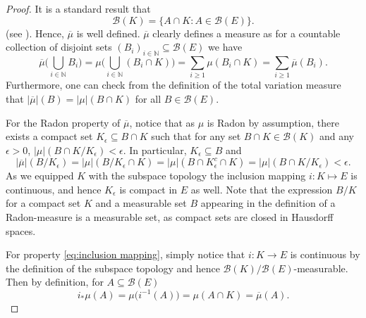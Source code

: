 \documentclass[11pt,a4paper,twoside,openany]{report}
\numberwithin{equation}{section}
\theoremstyle{plain} %
\theoremstyle{definition} %
\theoremstyle{remark} %
\let\parencite\authnumparencite
\begin{document}
\begin{proof}
    It is a standard result that 
    \begin{equation*}
        \mathcal{B}(K)=\{A\cap K:A\in\mathcal{B}(E)\}.
    \end{equation*}
    (see \parencite[Lemma.~6.2.4.]{Bogachev2007MeasureTheory}). Hence, \(\overline{\mu}\) is well defined. \(\overline{\mu}\) clearly defines a measure as for a countable collection of disjoint sets \((B_i)_{i\in\mathbb{N}}\subseteq\mathcal{B}(E)\) we have
    \begin{equation*}
        \overline{\mu}\Big(\bigcup_{i\in\mathbb{N}}B_i\Big)=\mu\Big(\bigcup_{i\in\mathbb{N}}(B_i\cap K)\Big)=\sum_{i\geq 1}\mu(B_i\cap K)=\sum_{i\geq 1}\overline{\mu}(B_i).
    \end{equation*}
    Furthermore, one can check from the definition of the total variation measure that \(|\overline{\mu}|(B)=|\mu|(B\cap K)\) for all \(B\in\mathcal{B}(E)\). 
    
    
           For the Radon property of \(\overline{\mu}\), notice that as \(\mu\) is Radon by assumption, there exists a compact set \(K_{\epsilon}\subseteq B\cap K\) such that for any set \(B\cap K\in\mathcal{B}(K)\) and any \(\epsilon>0\), \(|\mu|(B\cap K / K_{\epsilon})<\epsilon\). In particular, \(K_{\epsilon}\subseteq B\) and 
       \begin{equation*}
           |\overline{\mu}|(B/K_{\epsilon})=|\mu|(B/ K_{\epsilon}\cap K)=|\mu|(B\cap K_{\epsilon}^c\cap K)=|\mu|(B\cap K/ K_{\epsilon})<\epsilon.
       \end{equation*}
       As we equipped \(K\) with the subspace topology the inclusion mapping \(i:K\mapsto E\) is continuous, and hence \(K_{\epsilon}\) is compact in \(E\) as well. Note that the expression \(B/K\) for a compact set \(K\) and a measurable set \(B\) appearing in the definition of a Radon-measure is a measurable set, as compact sets are closed in Hausdorff spaces.

    
       For property \eqref{eq:inclusion mapping}, simply notice that \(i:K\to E\) is continuous by the definition of the subspace topology and hence \(\mathcal{B}(K)/\mathcal{B}(E)\)-measurable. Then by definition, for \(A\subseteq\mathcal{B}(E)\)
    \begin{equation*}
        i_*\mu(A) = \mu\big(i^{-1}(A)\big)=\mu(A\cap K)=\overline{\mu}(A).
    \end{equation*}
\end{proof}
\end{document}
